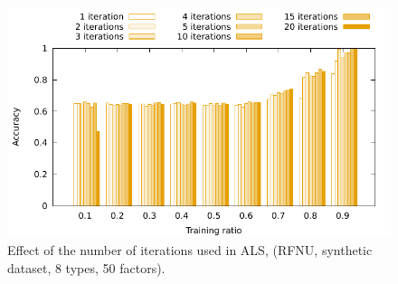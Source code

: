 \documentclass[10pt, conference, compsocconf]{IEEEtran}
\begin{document}
\begin{figure}
\centering
\includegraphics[width=0.6\columnwidth]{data/results/means_of_results/ALS/Synthetic/8type-RFNU-Differ-Num-Iterations-rank50/ALS-8-types-iteration.pdf}
\caption{Effect of the number of iterations used in ALS, (RFNU, synthetic dataset, 8 types, 50 factors).}
\label{fig:iterations}
\end{figure}
\end{document}
